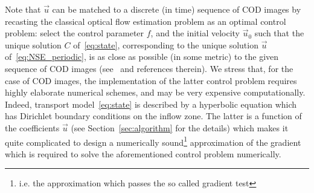 \documentclass[onecolumn, 12pt, conference]{ieeeconf}
\renewcommand{\u}{\vec{u}}
\begin{document}
Note that $\u$ can be matched to a discrete (in time) sequence of COD images %
by recasting the classical optical flow estimation problem as an optimal control problem: select the control parameter $f$, and the initial velocity $\u_0$ such that the unique solution $C$ of~\eqref{eq:state}, corresponding to the unique solution $\u$ of~\eqref{eq:NSE_periodic}, is as close as possible (in some metric) to the given sequence of COD images (see~\cite{na11,HerlinBMZ12} and references therein). We stress that, for the case of COD images, the implementation of the latter control problem requires highly elaborate numerical schemes, and may be very expensive computationally. Indeed, transport model~\eqref{eq:state} is described by a hyperbolic equation which has Dirichlet boundary conditions on the inflow zone. The latter is a function of the coefficients $\u$ (see Section~\ref{sec:algorithm} for the details) which makes it quite complicated to design a numerically sound\footnote{i.e. the approximation which passes the so called gradient test} approximation of the gradient which is required to solve the aforementioned control problem numerically.
\end{document}
